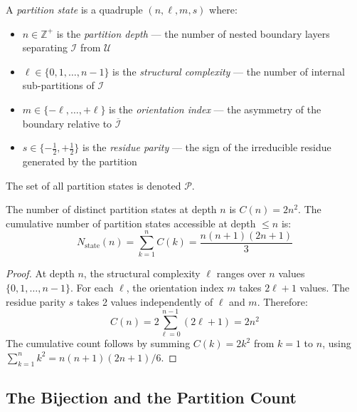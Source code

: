 \begin{definition}
\label{def:partition_state}
A \emph{partition state} is a quadruple $(n, \ell, m, s)$ where:
\begin{itemize}
    \item $n \in \mathbb{Z}^+$ is the \emph{partition depth} --- the number of
          nested boundary layers separating $\mathcal{I}$ from $\mathcal{U}$
    \item $\ell \in \{0, 1, \ldots, n-1\}$ is the \emph{structural complexity}
          --- the number of internal sub-partitions of $\mathcal{I}$
    \item $m \in \{-\ell, \ldots, +\ell\}$ is the \emph{orientation index}
          --- the asymmetry of the boundary relative to $\overline{\mathcal{I}}$
    \item $s \in \{-\frac{1}{2}, +\frac{1}{2}\}$ is the \emph{residue parity}
          --- the sign of the irreducible residue generated by the partition
\end{itemize}
The set of all partition states is denoted $\mathcal{P}$.
\end{definition}

\begin{theorem}
\label{thm:capacity}
The number of distinct partition states at depth $n$ is $C(n) = 2n^2$. The
cumulative number of partition states accessible at depth $\leq n$ is:
\begin{equation}
    N_{\mathrm{state}}(n) = \sum_{k=1}^{n} C(k) = \frac{n(n+1)(2n+1)}{3}
    \label{eq:cumulative_states}
\end{equation}
\end{theorem}

\begin{proof}
At depth $n$, the structural complexity $\ell$ ranges over $n$ values
$\{0, 1, \ldots, n-1\}$. For each $\ell$, the orientation index $m$ takes
$2\ell + 1$ values. The residue parity $s$ takes 2 values independently of
$\ell$ and $m$. Therefore:
\begin{equation}
    C(n) = 2 \sum_{\ell=0}^{n-1}(2\ell + 1) = 2n^2
\end{equation}
The cumulative count follows by summing $C(k) = 2k^2$ from $k=1$ to $n$,
using $\sum_{k=1}^n k^2 = n(n+1)(2n+1)/6$.
\end{proof}

\subsection{The Bijection and the Partition Count}
\label{subsec:bijection}

